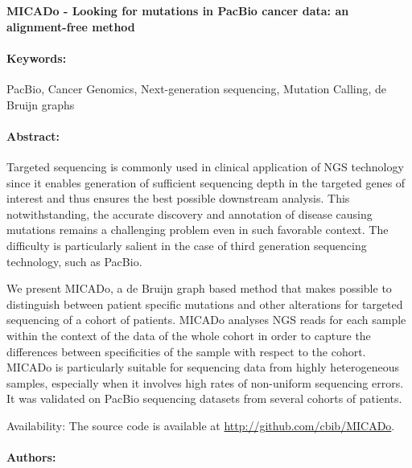 \noindent
\large {\bf MICADo - Looking for mutations in PacBio cancer data: an alignment-free method} 


\normalsize 


\noindent \paragraph{Keywords:} PacBio, Cancer Genomics, Next-generation sequencing, Mutation
Calling, de Bruijn graphs

\noindent \paragraph{Abstract:} 
Targeted sequencing is commonly used in clinical application of NGS technology since it enables generation
of sufficient sequencing depth in the targeted genes of interest and thus ensures the best possible downstream analysis.
This notwithstanding, the accurate discovery and annotation of disease causing mutations remains a challenging problem
even in such favorable context. The difficulty is particularly salient in the case of third generation sequencing technology,
such as PacBio.

We present MICADo, a de Bruijn graph based method that makes possible to distinguish between patient specific
mutations and other alterations for targeted sequencing of a cohort of patients. MICADo analyses NGS reads for each
sample within the context of the data of the whole cohort in order to capture the differences between specificities of the
sample with respect to the cohort. MICADo is particularly suitable for sequencing data from highly heterogeneous samples,
especially when it involves high rates of non-uniform sequencing errors. It was validated on PacBio sequencing datasets
from several cohorts of patients.

Availability: The source code is available at \url{http://github.com/cbib/MICADo}.


\noindent \paragraph{Authors:} 

\noindent \paragraph{} 

